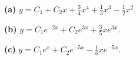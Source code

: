 \noindent\textbf{(a)} $y=C_1+C_2x+\tfrac34x^4+\tfrac13x^3-\tfrac12x^2$.

\noindent\textbf{(b)} $y=C_1e^{-2x}+C_2e^{3x}+\tfrac35xe^{3x}$.

\noindent\textbf{(c)} $y=C_1e^x+C_2e^{-5x}-\tfrac16xe^{-5x}$.
